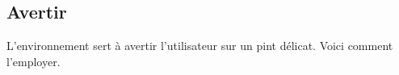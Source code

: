 

\usepackage[lang = french]{../main/main}
\usepackage{../macroenv/macroenv}
\usepackage{../showcase/showcase}
\usepackage{../listing/listing}
\usepackage{../inenglish/inenglish}


\usepackage{focus}





\subsection{Avertir}

L'environnement  sert à avertir l'utilisateur sur un pint délicat. Voici comment l'employer.



